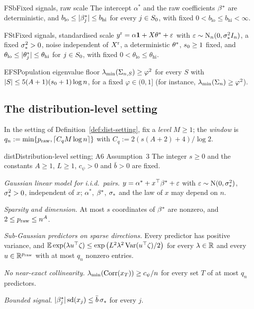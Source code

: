 \begin{assumption}{FSb}{Fixed signals, raw scale}
The intercept $\alpha^*$ and the raw coefficients $\beta^*$ are deterministic, and
$b_{\mathrm{lo}}\le\lvert \beta^*_j\rvert\le b_{\mathrm{hi}}$ for every $j\in S_0$, with fixed $0<b_{\mathrm{lo}}\le b_{\mathrm{hi}}<\infty$.
\end{assumption}

\begin{assumption}{FSt}{Fixed signals, standardised scale}
$y^{\mathrm r}=\alpha\mathbf{1}+X\theta^*+\varepsilon$ with $\varepsilon\sim\mathrm{N}_n(0,\sigma_*^2I_n)$, a fixed $\sigma_*^2>0$, noise independent
of $X^{\mathrm r}$, a deterministic $\theta^*$, $s_0\ge1$ fixed, and $\theta_{\mathrm{lo}}\le\lvert \theta^*_j\rvert\le\theta_{\mathrm{hi}}$ for
$j\in S_0$, with fixed $0<\theta_{\mathrm{lo}}\le\theta_{\mathrm{hi}}$.
\end{assumption}

\begin{assumption}{EFS}{Population eigenvalue floor}
$\lambda_{\min}(\Sigma_{n,S})\ge\varphi^2$ for every $S$ with $\lvert S\rvert\le5(A+1)(s_0+1)\log n$, for a fixed $\varphi\in(0,1]$ (for
instance, $\lambda_{\min}(\Sigma_n)\ge\varphi^2$).
\end{assumption}

\subsection{The distribution-level setting}\label{sec:a-dist}

In the setting of Definition~\ref{def:dist-setting}, fix a \emph{level} $M\ge1$; the \emph{window} is
$q_n:=\min\{p_{\mathrm{raw}},\lceil C_qM\log n\rceil\}$ with $C_q:=2(s(A+2)+4)/\log2$.

\begin{assumption}{dist}{Distribution-level setting; A6 Assumption~3}
The integer $s\ge0$ and the constants $A\ge1$, $L\ge1$, $c_\psi>0$ and $\bar b>0$ are fixed.
\begin{asmitems}
  \item\label{asm:dist-model} \emph{Gaussian linear model for i.i.d.\ pairs.} $y=\alpha^*+x^\top\beta^*+\varepsilon$ with
    $\varepsilon\sim\mathrm{N}(0,\sigma_*^2)$, $\sigma_*^2>0$, independent of $x$; $\alpha^*$, $\beta^*$, $\sigma_*$ and the law of $x$ may
    depend on $n$.
  \item\label{asm:dist-sparse} \emph{Sparsity and dimension.} At most $s$ coordinates of $\beta^*$ are nonzero, and
    $2\le p_{\mathrm{raw}}\le n^A$.
  \item\label{asm:dist-subg} \emph{Sub-Gaussian predictors on sparse directions.} Every predictor has positive variance,
    and $\operatorname{\mathbb{E}}\exp(\lambda u^\top\zeta)\le\exp\big(L^2\lambda^2\operatorname{Var}(u^\top\zeta)/2\big)$ for every $\lambda\in\mathbb{R}$ and every
    $u\in\mathbb{R}^{p_{\mathrm{raw}}}$ with at most $q_n$ nonzero entries.
  \item\label{asm:dist-nec} \emph{No near-exact collinearity.} $\lambda_{\min}(\operatorname{Corr}(x_T))\ge c_\psi/n$ for every set $T$ of at
    most $q_n$ predictors.
  \item\label{asm:dist-bs} \emph{Bounded signal.} $\lvert \beta^*_j\rvert\operatorname{sd}(x_j)\le\bar b\,\sigma_*$ for every $j$.
\end{asmitems}
\end{assumption}

